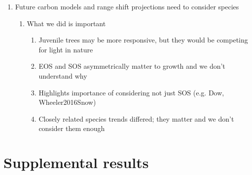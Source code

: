 \begin{enumerate}
\item Future carbon models and range shift projections need to consider species 

  \begin{enumerate}
  \item What we did is important 
    \begin{enumerate}
  
    \item Juvenile trees may be more responsive, but they would be competing for light in nature
    
    \item EOS and SOS asymmetrically matter to growth and we don't understand why
    
    \item Highlights importance of considering not just SOS (e.g. Dow, Wheeler2016Snow)
  
    \item Closely related species trends differed; they matter and we don't consider them enough
    
    \end{enumerate}

  \end{enumerate}
\end{enumerate}

\clearpage
\section*{Supplemental results}

\setcounter{table}{0}
\renewcommand{\thetable}{S\arabic{table}}
\setcounter{figure}{0}
\renewcommand{\thefigure}{S\arabic{figure}}

